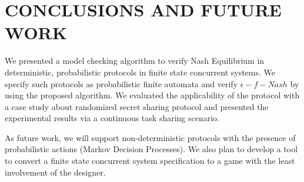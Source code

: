\section{CONCLUSIONS AND FUTURE WORK}
We presented a model checking algorithm  to verify Nash Equilibrium in deterministic, probabilistic protocols in finite state concurrent systems. We specify such protocols as probabilistic finite automata and verify $\epsilon-f-Nash$\cite{MMS08} by using the proposed algorithm. We evaluated the applicability of the protocol with a case study about randomized secret sharing protocol\cite{HT04} and presented the experimental results via a continuous task sharing scenario.\newline

As future work, we will support non-deterministic protocols with the presence of probabilistic actions (Markov Decision Processes). We also plan to develop a tool to convert a finite state concurrent system specification to a game with the least involvement of the designer.  